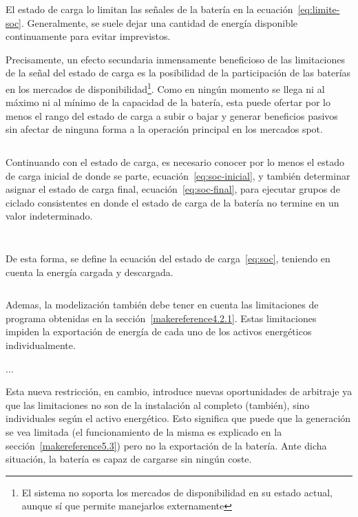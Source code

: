 El estado de carga lo limitan las señales de la batería en la ecuación~\ref{eq:limite-soc}. Generalmente, se suele dejar una cantidad de energía disponible continuamente para evitar imprevistos.

Precisamente, un efecto secundaria inmensamente beneficioso de las limitaciones de la señal del estado de carga es la posibilidad de la participación de las baterías en los mercados de disponibilidad\footnote{El sistema no soporta los mercados de disponibilidad en su estado actual, aunque sí que permite manejarlos externamente}. Como en ningún momento se llega ni al máximo ni al mínimo de la capacidad de la batería, esta puede ofertar por lo menos el rango del estado de carga a subir o bajar y generar beneficios pasivos sin afectar de ninguna forma a la operación principal en los mercados spot.

\begin{equation}
  \label{eq:limite-soc}
\end{equation}

Continuando con el estado de carga, es necesario conocer por lo menos el estado de carga inicial de donde se parte, ecuación~\ref{eq:soc-inicial}, y también determinar asignar el estado de carga final, ecuación~\ref{eq:soc-final}, para ejecutar grupos de ciclado consistentes en donde el estado de carga de la batería no termine en un valor indeterminado.

\begin{equation}
  \label{eq:soc-inicial}
\end{equation}

\begin{equation}
  \label{eq:soc-final}
\end{equation}

De esta forma, se define la ecuación del estado de carga~\ref{eq:soc}, teniendo en cuenta la energía cargada y descargada.

\begin{equation}
  \label{eq:soc}
\end{equation}

Ademas, la modelización también debe tener en cuenta las limitaciones de programa obtenidas en la sección~\ref{makereference4.2.1}. Estas limitaciones impiden la exportación de energía de cada uno de los activos energéticos individualmente.

...

Esta nueva restricción, en cambio, introduce nuevas oportunidades de arbitraje ya que las limitaciones no son de la instalación al completo (también), sino individuales según el activo energético. Esto significa que puede que la generación se vea limitada (el funcionamiento de la misma es explicado en la sección~\ref{makereference5.3}) pero no la exportación de la batería. Ante dicha situación, la batería es capaz de cargarse sin ningún coste.

